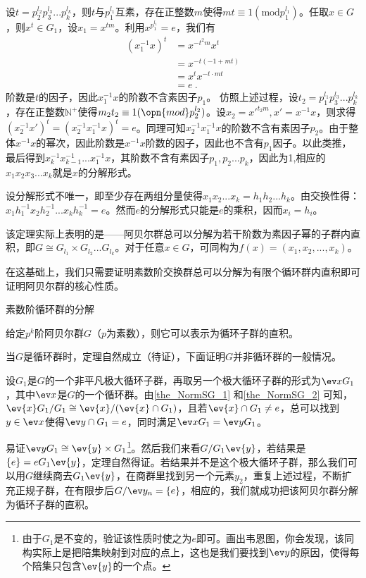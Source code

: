 设$t=p_2^{l_2}p_3^{l_3}...p_k^{l_k}$，则$t$与$p_1^{l_1}$互素，存在正整数$m$使得$mt\equiv 1(\mathrm {mod} p_1^{l_1})$。任取$x\in G$，则$x^t\in G_1$，设$x_1=x^{tm}$。利用$x^{p_1^{l_1}}=e$，我们有
\begin{equation}
\begin{aligned}
(x_1^{-1}x)^t&=x^{-t^2m}x^t\\
&=x^{-t(-1+mt)}\\
&=x^tx^{-t\cdot mt}\\
&=e~.
\end{aligned}
\end{equation}
阶数是$t$的因子，因此$x_1^{-1}x$的阶数不含素因子$p_1$。
仿照上述过程，设$t_2=p_1^{l_1}p_3^{l_3}...p_k^{l_k}$，存在正整数$\mathbb N^{+}$使得$m_2t_2\equiv 1(\opn{mod}p_2^{l_2})$。设$x_2=x'^{t_2m},x'=x^{-1}x$，则求得$(x_2^{-1}x')^t=(x_2^{-1}x_1^{-1}x)^t=e$。同理可知$x_2^{-1}x_1^{-1}x$的阶数不含有素因子$p_2$。由于整体$x^{-1}x$的幂次，因此阶数是$x^{-1}x$阶数的因子，因此也不含有$p_1$因子。以此类推，最后得到$x_k^{-1}x_{k-1}^{-1}...x_1^{-1}x$，其阶数不含有素因子$p_1,p_2...p_k$，因此为1,相应的$x_1x_2x_3...x_k$就是$x$的分解形式。

设分解形式不唯一，即至少存在两组分量使得$x_1x_2...x_k=h_1h_2...h_k$。由交换性得：$x_1h_1^{-1}x_2h_2^{-1}...x_kh_k^{-1}=e$。然而$e$的分解形式只能是$e$的乘积，因而$x_i=h_i$。

该定理实际上表明的是——阿贝尔群总可以分解为若干阶数为素因子幂的子群内直积，即$G\cong G_{l_1}\times G_{l_2}...G_{l_k}$。对于任意$x\in G$，可同构为$f(x)=(x_1,x_2,...,x_k)$。

在这基础上，我们只需要证明素数阶交换群总可以分解为有限个循环群内直积即可证明阿贝尔群的核心性质。
\begin{example}{素数阶循环群的分解}

\end{example}
\begin{theorem}{}
给定$p^k$阶阿贝尔群$G$（$p$为素数），则它可以表示为循环子群的直积。
\end{theorem}
当$G$是循环群时，定理自然成立（待证），下面证明$G$并非循环群的一般情况。

设$G_1$是$G$的一个非平凡极大循环子群，再取另一个极大循环子群的形式为$\ev x G_1$，其中$\ev x$是$G$的一个循环群。由\autoref{the_NormSG_1} 和\autoref{the_NormSG_2} 可知，$\ev{x}G_1/G_1\cong \ev{x}/(\ev{x}\cap G_1)$，且若$\ev{x}\cap G_1\neq {e}$，总可以找到$y\in \ev x$使得$\ev y\cap G_1={e}$，同时满足$\ev xG_1=\ev y G_1$。

易证$\ev yG_1\cong \ev{y}\times G_1$\footnote{由于$G_1$是不变的，验证该性质时使之为$e$即可。画出韦恩图，你会发现，该同构实际上是把陪集映射到对应的点上，这也是我们要找到$\ev y$的原因，使得每个陪集只包含$\ev{y}$的一个点。}。然后我们来看$G/G_1\ev{y}$，若结果是$\{e\}=eG_1\ev{y}$，定理自然得证。若结果并不是这个极大循环子群，那么我们可以用$G$继续商去$G_1\ev{y}$，在商群里找到另一个元素$y_2$，重复上述过程，不断扩充正规子群，在有限步后$G/{\ev y_n}=\{e\}$，相应的，我们就成功把该阿贝尔群分解为循环子群的直积。

